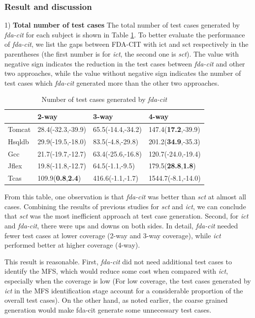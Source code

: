 \documentclass[10pt,journal,compsoc]{IEEEtran}
\begin{document}
\subsubsection{Result and discussion}

1) \textbf{Total number of test cases}
The total number of test cases generated by \emph{fda-cit} for each subject is shown in Table \ref{num-fda-cit}. To better evaluate the performance of \emph{fda-cit}, we list the gaps between FDA-CIT with ict and sct respectively in the parentheses (the first number is for \emph{ict}, the second one is \emph{sct}). The value with negative sign indicates the reduction in the test cases between \emph{fda-cit} and other two approaches, while the value without negative sign indicates the number of test cases which \emph{fda-cit} generated more than the other two approaches.

\begin{table}[ht]
\caption{Number of test cases generated by \emph{fda-cit}}
\label{num-fda-cit}
\centering
    \begin{tabular}{|l|l|l|l|}
    \hline
    ~      & 2-way                     & 3-way                     & 4-way                       \\ \hline
Tomcat	&28.4(-32.3,-39.9)	&65.5(-14.4,-34.2)	&147.4(\textbf{17.2},-39.9)	\\
Hsqldb	&29.9(-19.5,-18.0)	&83.5(-4.8,-29.8)	&201.2(\textbf{34.9},-35.3)	\\
Gcc	&21.7(-19.7,-12.7)	&63.4(-25.6,-16.8)	&120.7(-24.0,-19.4)	\\
Jflex	&19.8(-11.8,-12.7)	&64.5(-1.1,-9.5)	&179.5(\textbf{28.8},\textbf{1.8})	\\
Tcas	&109.9(\textbf{0.8},\textbf{2.4})	&416.6(-1.1,-1.7)	&1544.7(-8.1,-14.0)	\\\hline
    \end{tabular}
\end{table}

From this table, one observation is that \emph{fda-cit} was better than \emph{sct} at almost all cases. Combining the results of previous studies for \emph{sct} and \emph{ict}, we can conclude that \emph{sct} was the most inefficient approach at test case generation. Second, for \emph{ict} and \emph{fda-cit}, there were ups and downs on both sides. In detail, \emph{fda-cit} needed fewer test cases at lower coverage (2-way  and 3-way coverage), while \emph{ict} performed better at higher coverage (4-way).

This result is reasonable. First, \emph{fda-cit} did not need additional test cases to identify the MFS, which would reduce some cost when compared with \emph{ict}, especially when the coverage is low (For low coverage, the test cases generated by \emph{ict} in the MFS identification stage account for a considerable proportion of the overall test cases). On the other hand, as noted earlier, the coarse grained generation would make fda-cit generate some unnecessary test cases.
\end{document}

